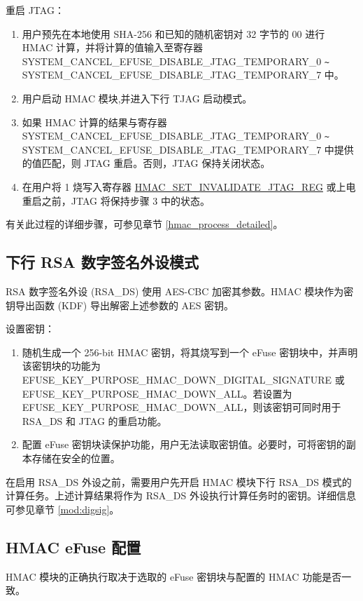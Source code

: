 \documentclass[main\_\_CN.tex]{subfiles}
\begin{document}
重启 JTAG：
\begin{enumerate}
    \item 用户预先在本地使用 SHA-256 和已知的随机密钥对 32 字节的 \hexprefix{}00 进行 HMAC 计算，并将计算的值输入至寄存器 SYSTEM\_CANCEL\_EFUSE\_DISABLE\_JTAG\_TEMPORARY\_0 \verb+~+\\ SYSTEM\_CANCEL\_EFUSE\_DISABLE\_JTAG\_TEMPORARY\_7 中。
    \item 用户启动 HMAC 模块,并进入下行 TJAG 启动模式。
    \item 如果 HMAC 计算的结果与寄存器 SYSTEM\_CANCEL\_EFUSE\_DISABLE\_JTAG\_TEMPORARY\_0 \verb+~+\\ SYSTEM\_CANCEL\_EFUSE\_DISABLE\_JTAG\_TEMPORARY\_7 中提供的值匹配，则 JTAG 重启。否则，JTAG 保持关闭状态。
    \item 在用户将 1 烧写入寄存器 \hyperref[regdesc:HMACSETINVALIDATEJTAGREG]{HMAC\_SET\_INVALIDATE\_JTAG\_REG} 或上电重启之前，JTAG 将保持步骤 3 中的状态。
    \end{enumerate}

有关此过程的详细步骤，可参见章节 \ref{hmac_process_detailed}。

\subsection{下行 RSA 数字签名外设模式}

RSA 数字签名外设 (RSA\_DS) 使用 AES-CBC 加密其参数。HMAC 模块作为密钥导出函数 (KDF) 导出解密上述参数的 AES 密钥。

设置密钥：

\begin{enumerate}
    \item 随机生成一个 256-bit HMAC 密钥，将其烧写到一个 eFuse 密钥块中，并声明该密钥块的功能为\\ EFUSE\_KEY\_PURPOSE\_HMAC\_DOWN\_DIGITAL\_SIGNATURE 或 EFUSE\_KEY\_PURPOSE\_HMAC\_DOWN\_ALL。若设置为 EFUSE\_KEY\_PURPOSE\_HMAC\_DOWN\_ALL，则该密钥可同时用于 RSA\_DS 和 JTAG 的重启功能。
    \item 配置 eFuse 密钥块读保护功能，用户无法读取密钥值。必要时，可将密钥的副本存储在安全的位置。
\end{enumerate}

在启用 RSA\_DS 外设之前，需要用户先开启 HMAC 模块下行 RSA\_DS 模式的计算任务。上述计算结果将作为 RSA\_DS 外设执行计算任务时的密钥。详细信息可参见章节 \ref{mod:digsig}。

\subsection{HMAC eFuse 配置}
\label{hmac_config_function}
HMAC 模块的正确执行取决于选取的 eFuse 密钥块与配置的 HMAC 功能是否一致。
\end{document}
